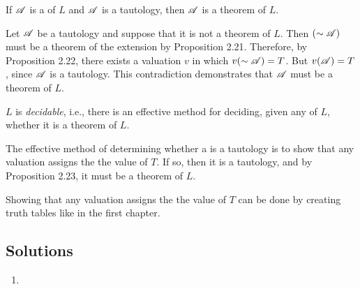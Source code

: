 \begin{proposition}
  If \(\mathscr{A}\) is a \wf{} of \(L\) and \(\mathscr{A}\) is a tautology, then \(\mathscr{A}\) is a theorem of \(L\).

  \prf{} Let \(\mathscr{A}\) be a tautology and suppose that it is not a theorem of \(L\). Then \((\sim\mathscr{A})\) must be a theorem of the extension \Lext{} by Proposition 2.21. Therefore, by Proposition 2.22, there exists a valuation \(v\) in which \(v(\sim\mathscr{A}) = T\). But \(v(\mathscr{A}) = T\), since \(\mathscr{A}\) is a tautology. This contradiction demonstrates that \(\mathscr{A}\) must be a theorem of \(L\).
\end{proposition}

\begin{proposition}
  \(L\) is \textit{decidable}, i.e., there is an effective method for deciding, given any \wf{} of \(L\), whether it is a theorem of \(L\).

  \prf{} The effective method of determining whether a \wf{} is a tautology is to show that any valuation assigns the \wf{} the value of \(T\). If so, then it is a tautology, and by Proposition 2.23, it must be a theorem of \(L\).

  \note{} Showing that any valuation assigns the \wf{} the value of \(T\) can be done by creating truth tables like in the first chapter.
\end{proposition}

\subsection*{Solutions}

\begin{enumerate}
  \item
\end{enumerate}
